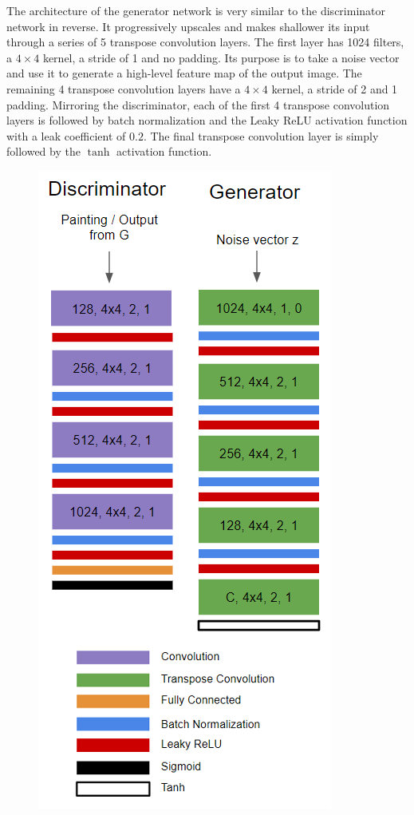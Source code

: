 \documentclass[10pt,twocolumn,letterpaper]{article}
\begin{document}
The architecture of the generator network is very similar to the discriminator network in reverse. It progressively upscales and makes shallower its input through a series of 5 transpose convolution layers. The first layer has 1024 filters, a $ 4 \times 4 $ kernel, a stride of 1 and no padding. Its purpose is to take a noise vector and use it to generate a high-level feature map of the output image. The remaining 4 transpose convolution layers have a $ 4 \times 4 $ kernel, a stride of 2 and 1 padding. Mirroring the discriminator, each of the first 4 transpose convolution layers is followed by batch normalization and the Leaky ReLU activation function \cite{maas2013rectifier} with a leak coefficient of $ 0.2 $. The final transpose convolution layer is simply followed by the $ \tanh $ activation function.

\begin{figure}[t]
	\begin{center}
		\includegraphics[width=0.9\linewidth]{nets1.png}

\end{center}
\end{figure}
\end{document}
